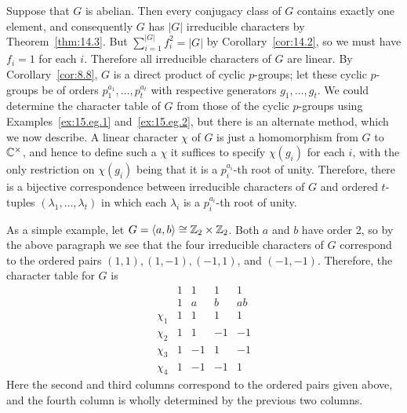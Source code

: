 \documentclass[../Odyssey_Project.tex]{subfiles}
\begin{document}
\begin{example}
\label{ex:15.eg.3}
Suppose that $G$ is abelian. Then every conjugacy class of $G$ contains exactly one element, and consequently $G$ has $|G|$ irreducible characters by Theorem~\ref{thm:14.3}. But $\sum_{i=1}^{|G|} f_i^2 = |G|$ by Corollary~\ref{cor:14.2}, so we must have $f_i = 1$ for each $i$. Therefore all irreducible characters of $G$ are linear. By Corollary~\ref{cor:8.8}, $G$ is a direct product of cyclic $p$-groups; let these cyclic $p$-groups be of orders $p_1^{a_1}, \ldots, p_t^{a_t}$ with respective generators $g_1, \ldots, g_t$. We could determine the character table of $G$ from those of the cyclic $p$-groups using Examples~\ref{ex:15.eg.1} and~\ref{ex:15.eg.2}, but there is an alternate method, which we now describe. A linear character $\chi$ of $G$ is just a homomorphism from $G$ to $\mathbb{C}^\times$, and hence to define such a $\chi$ it suffices to specify $\chi(g_i)$ for each $i$, with the only restriction on $\chi(g_i)$ being that it is a $p_i^{a_i}$-th root of unity. Therefore, there is a bijective correspondence between irreducible characters of $G$ and ordered $t$-tuples $(\lambda_1, \ldots, \lambda_t)$ in which each $\lambda_i$ is a $p_i^{a_i}$-th root of unity.

As a simple example, let $G = \langle a, b \rangle \cong \mathbb{Z}_2 \times \mathbb{Z}_2$. Both $a$ and $b$ have order 2, so by the above paragraph we see that the four irreducible characters of $G$ correspond to the ordered pairs $(1,1), (1,-1), (-1,1)$, and $(-1,-1)$. Therefore, the character table for $G$ is
\[
    \begin{array}{c|cccc}
        & 1 & 1 & 1 & 1 \\
        & 1 & a & b & ab \\
        \hline
        \chi_1 & 1 & 1 & 1 & 1 \\
        \chi_2 & 1 & 1 & -1 & -1 \\
        \chi_3 & 1 & -1 & 1 & -1 \\
        \chi_4 & 1 & -1 & -1 & 1
    \end{array}
\]
Here the second and third columns correspond to the ordered pairs given above, and the fourth column is wholly determined by the previous two columns.
\end{example}
\end{document}
